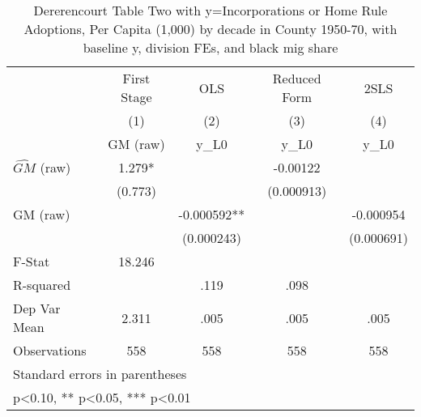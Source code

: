 \begin{table}[htbp]\centering
\def\sym#1{\ifmmode^{#1}\else\(^{#1}\)\fi}
\caption{Dererencourt Table Two with y=Incorporations or Home Rule Adoptions, Per Capita (1,000) by decade in County 1950-70, with baseline y, division FEs, and black mig share}
\begin{tabular}{l*{4}{c}}
\toprule
                    & First Stage   &         OLS   &Reduced Form   &        2SLS   \\
                    &\multicolumn{1}{c}{(1)}&\multicolumn{1}{c}{(2)}&\multicolumn{1}{c}{(3)}&\multicolumn{1}{c}{(4)}\\
                    &\multicolumn{1}{c}{GM  (raw)}&\multicolumn{1}{c}{y\_L0}&\multicolumn{1}{c}{y\_L0}&\multicolumn{1}{c}{y\_L0}\\
\midrule
$\hat{GM}$ (raw)    &       1.279*  &               &    -0.00122   &               \\
                    &     (0.773)   &               &  (0.000913)   &               \\
\addlinespace
GM  (raw)           &               &   -0.000592** &               &   -0.000954   \\
                    &               &  (0.000243)   &               &  (0.000691)   \\
\midrule
F-Stat              &      18.246   &               &               &               \\
R-squared           &               &        .119   &        .098   &               \\
Dep Var Mean        &       2.311   &        .005   &        .005   &        .005   \\
Observations        &         558   &         558   &         558   &         558   \\
\bottomrule
\multicolumn{5}{l}{\footnotesize Standard errors in parentheses}\\
\multicolumn{5}{l}{\footnotesize * p<0.10, ** p<0.05, *** p<0.01}\\
\end{tabular}
\end{table}
